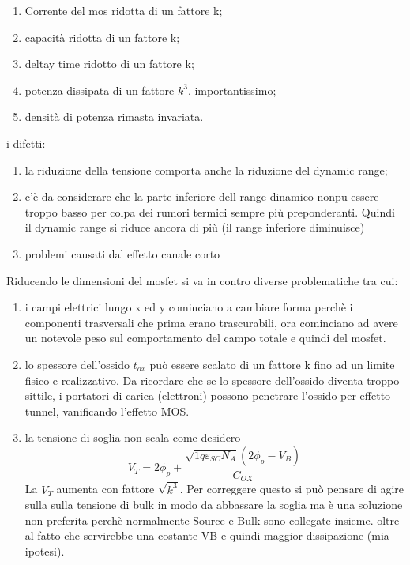 %
\begin{exbox}
    \begin{enumerate}
        \item Corrente del mos ridotta di un fattore k;
        \item capacità ridotta di un fattore k;
        \item deltay time ridotto di un fattore k;
        \item potenza dissipata di un fattore $k^3$. importantissimo;
        \item densità di potenza rimasta invariata.
    \end{enumerate}
    i difetti:
    \begin{enumerate}
        \item la riduzione della tensione comporta anche la riduzione del dynamic range;
        \item c'è da considerare che la parte inferiore dell range dinamico nonpu essere troppo basso per colpa dei rumori termici sempre più preponderanti. Quindi il dynamic range si riduce ancora di più (il range inferiore diminuisce)
        \item problemi causati dal effetto canale corto
    \end{enumerate}
\end{exbox}
%
Riducendo le dimensioni del mosfet si va in contro diverse problematiche tra cui:

\begin{enumerate}
    \item i campi elettrici lungo x ed y cominciano a cambiare forma perchè i componenti trasversali che prima erano trascurabili, ora cominciano ad avere un notevole peso sul comportamento del campo totale e quindi del mosfet.
    \item lo spessore dell'ossido $t_{ox}$ può essere scalato di un fattore k fino ad un limite fisico e realizzativo. Da ricordare che se lo spessore dell'ossido diventa troppo sittile, i portatori di carica (elettroni) possono penetrare l'ossido per effetto tunnel, vanificando l'effetto MOS.
    \item la tensione di soglia non scala come desidero
    \begin{equation}
        V_T=2\phi_p + \dfrac{\sqrt{1q\varepsilon_{SC}N_A}(2\phi_p-V_B)}{C_{OX}}
    \end{equation}
    La $V_T$ aumenta con fattore $\sqrt{k^3}$. Per correggere questo si può pensare di agire sulla sulla tensione di bulk in modo da abbassare la soglia ma è una soluzione non preferita perchè normalmente Source e Bulk sono collegate insieme. oltre al fatto che servirebbe una costante VB e quindi maggior dissipazione (mia ipotesi).
\end{enumerate}
%
\cleardoublepage
